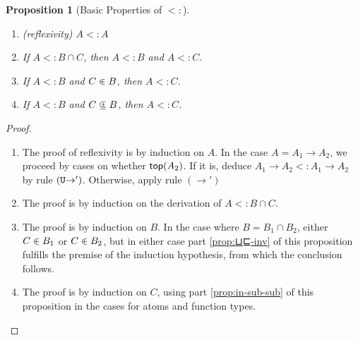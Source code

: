\documentclass{article}
\newtheorem{proposition}[theorem]{Proposition}
\begin{document}
\begin{proposition}[Basic Properties of $<:$]\ \label{prop:subtyping}
  \begin{enumerate}
  \item (reflexivity) $A <: A$ \label{prop:⊑-refl}
  \item If $A <: B \cap C$, then $A <: B$ and $A <: C$. \label{prop:⊔⊑-inv}
  \item If $A <: B$ and $C \inplus B$, then $A <: C$.\label{prop:in-sub-sub}
  \item If $A <: B$ and $C \subsetpluseq B$, then $A <: C$.\label{prop:subset-sub-sub}
  \end{enumerate}
\end{proposition}
\begin{proof}\ 
  \begin{enumerate}
  \item The proof of reflexivity is by induction on $A$. In the case
    $A = A_1 \to A_2$, we proceed by cases on whether $\mathsf{top}(A_2)$.
    If it is, deduce $A_1 \to A_2 <: A_1 \to A_2$ by rule $(\mathtt{U}{\to}')$.
    Otherwise, apply rule $(\to')$
  \item The proof is by induction on the derivation of $A <: B \cap C$.
  \item The proof is by induction on $B$. In the case where $B = B_1
    \cap B_2$, either $C \inplus B_1$ or $C \inplus B_2$, but in either case part
    \ref{prop:⊔⊑-inv} of this proposition fulfills the premise of
    the induction hypothesis, from which the conclusion follows.
  \item The proof  is by induction on $C$, using part \ref{prop:in-sub-sub}
    of this proposition in the cases for atoms and function types.
  \end{enumerate}
\end{proof}
\end{document}
